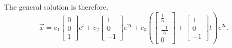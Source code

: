 \documentclass{ximera}
\begin{document}
\begin{exampleSol}
    The general solution is therefore,
    \begin{equation*}
        \vec{x} = c_1
        \begin{bmatrix} 
            0 \\ 
            0 \\ 
            1 
        \end{bmatrix}
        e^t + c_2 
        \begin{bmatrix} 
            1 \\ 
            0 \\ 
            -1 
        \end{bmatrix}
        e^{2t} + c_3 \left(
        \begin{bmatrix} 
            \frac{1}{5} \\ 
            \frac{-1}{5} \\ 
            0 
        \end{bmatrix}
        +
        \begin{bmatrix} 
            1 \\ 
            0 \\ 
            -1 
        \end{bmatrix}
        t \right)e^{2t} .
    \end{equation*}
\end{exampleSol}
\end{document}

